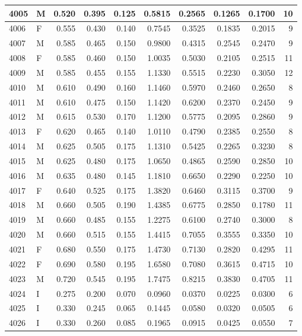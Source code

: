 \documentclass[9pt,twocolumn,twoside,]{pnas-new}
\begin{document}
\begin{tabular}{l|l|r|r|r|r|r|r|r|r}
\hline
4005 & M & 0.520 & 0.395 & 0.125 & 0.5815 & 0.2565 & 0.1265 & 0.1700 & 10\\
\hline
4006 & F & 0.555 & 0.430 & 0.140 & 0.7545 & 0.3525 & 0.1835 & 0.2015 & 9\\
\hline
4007 & M & 0.585 & 0.465 & 0.150 & 0.9800 & 0.4315 & 0.2545 & 0.2470 & 9\\
\hline
4008 & F & 0.585 & 0.460 & 0.150 & 1.0035 & 0.5030 & 0.2105 & 0.2515 & 11\\
\hline
4009 & M & 0.585 & 0.455 & 0.155 & 1.1330 & 0.5515 & 0.2230 & 0.3050 & 12\\
\hline
4010 & M & 0.610 & 0.490 & 0.160 & 1.1460 & 0.5970 & 0.2460 & 0.2650 & 8\\
\hline
4011 & M & 0.610 & 0.475 & 0.150 & 1.1420 & 0.6200 & 0.2370 & 0.2450 & 9\\
\hline
4012 & M & 0.615 & 0.530 & 0.170 & 1.1200 & 0.5775 & 0.2095 & 0.2860 & 9\\
\hline
4013 & F & 0.620 & 0.465 & 0.140 & 1.0110 & 0.4790 & 0.2385 & 0.2550 & 8\\
\hline
4014 & M & 0.625 & 0.505 & 0.175 & 1.1310 & 0.5425 & 0.2265 & 0.3230 & 8\\
\hline
4015 & M & 0.625 & 0.480 & 0.175 & 1.0650 & 0.4865 & 0.2590 & 0.2850 & 10\\
\hline
4016 & M & 0.635 & 0.480 & 0.145 & 1.1810 & 0.6650 & 0.2290 & 0.2250 & 10\\
\hline
4017 & F & 0.640 & 0.525 & 0.175 & 1.3820 & 0.6460 & 0.3115 & 0.3700 & 9\\
\hline
4018 & M & 0.660 & 0.505 & 0.190 & 1.4385 & 0.6775 & 0.2850 & 0.1780 & 11\\
\hline
4019 & M & 0.660 & 0.485 & 0.155 & 1.2275 & 0.6100 & 0.2740 & 0.3000 & 8\\
\hline
4020 & M & 0.660 & 0.515 & 0.155 & 1.4415 & 0.7055 & 0.3555 & 0.3350 & 10\\
\hline
4021 & F & 0.680 & 0.550 & 0.175 & 1.4730 & 0.7130 & 0.2820 & 0.4295 & 11\\
\hline
4022 & F & 0.690 & 0.580 & 0.195 & 1.6580 & 0.7080 & 0.3615 & 0.4715 & 10\\
\hline
4023 & M & 0.720 & 0.545 & 0.195 & 1.7475 & 0.8215 & 0.3830 & 0.4705 & 11\\
\hline
4024 & I & 0.275 & 0.200 & 0.070 & 0.0960 & 0.0370 & 0.0225 & 0.0300 & 6\\
\hline
4025 & I & 0.330 & 0.245 & 0.065 & 0.1445 & 0.0580 & 0.0320 & 0.0505 & 6\\
\hline
4026 & I & 0.330 & 0.260 & 0.085 & 0.1965 & 0.0915 & 0.0425 & 0.0550 & 7\\

\end{tabular}
\end{document}
